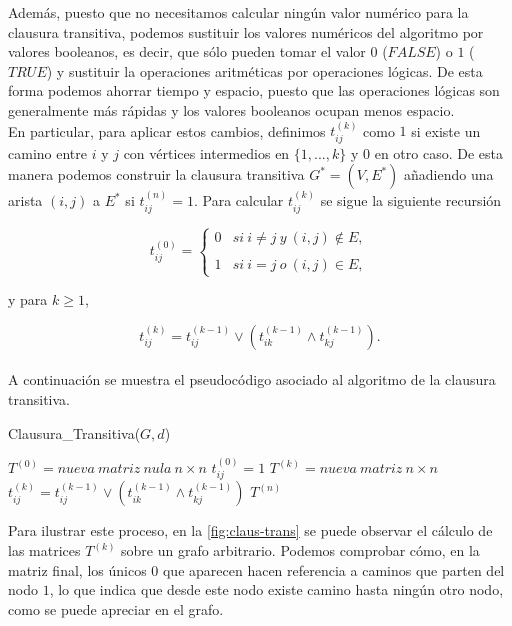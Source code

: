 Además, puesto que no necesitamos calcular ningún valor numérico para la clausura transitiva, podemos sustituir los valores numéricos del algoritmo por valores booleanos, es decir, que sólo pueden tomar el valor $0$ ($FALSE$) o $1$ ($TRUE$) y sustituir la operaciones aritméticas por operaciones lógicas. De esta forma podemos ahorrar tiempo y espacio, puesto que las operaciones lógicas son generalmente más rápidas y los valores booleanos ocupan menos espacio. \\

En particular, para aplicar estos cambios, definimos $t_{ij}^{(k)}$ como $1$ si existe un camino entre $i$ y $j$ con vértices intermedios en $\{1,...,k\}$ y $0$ en otro caso. De esta manera podemos construir la clausura transitiva $G^*=(V,E^*)$ añadiendo una arista $(i,j)$ a $E^*$ si $t_{ij}^{(n)}=1$. Para calcular $t_{ij}^{(k)}$ se sigue la siguiente recursión

$$t_{ij}^{(0)}= \left\{ \begin{array}{lcc}
	0 &   si\ i\neq j\ y\ (i,j)\notin E, \\
	\\ 1 & si\ i= j\ o\ (i,j)\in E,
\end{array}
\right.$$

y para $k\geq 1$,

$$t_{ij}^{(k)}=t_{ij}^{(k-1)}\lor (t_{ik}^{(k-1)}\wedge t_{kj}^{(k-1)}).$$ \\

A continuación se muestra el pseudocódigo asociado al algoritmo de la clausura transitiva.

\begin{breakablealgorithm}
	\caption{Clausura\_Transitiva($G,d$)}
	\begin{algorithmic}[1]
		\State $T^{(0)}=nueva\ matriz\ nula\ n\times n$
			\State $t_{ij}^{(0)}=1$
		\EndFor
			\State $T^{(k)}=nueva\ matriz\ n\times n$
					\State $t_{ij}^{(k)}=t_{ij}^{(k-1)}\lor (t_{ik}^{(k-1)}\wedge t_{kj}^{(k-1)})$
				\EndFor
			\EndFor
		\EndFor
		\Return $T^{(n)}$
	\end{algorithmic}
\end{breakablealgorithm}

Para ilustrar este proceso, en la \autoref{fig:claus-trans} se puede observar el cálculo de las matrices $T^{(k)}$ sobre un grafo arbitrario. Podemos comprobar cómo, en la matriz final, los únicos $0$ que aparecen hacen referencia a caminos que parten del nodo $1$, lo que indica que desde este nodo existe camino hasta ningún otro nodo, como se puede apreciar en el grafo.



\endinput




